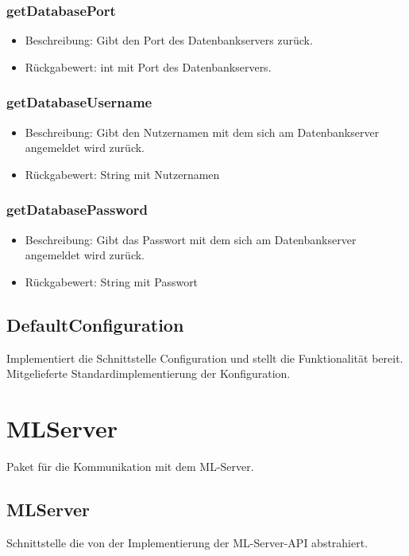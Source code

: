 \documentclass[a4paper]{scrreprt}
\begin{document}
    \subsubsection{getDatabasePort}
    \begin{itemize}
        \item Beschreibung: Gibt den Port des Datenbankservers zurück.
        \item Rückgabewert: int mit Port des Datenbankservers.
    \end{itemize}

    \subsubsection{getDatabaseUsername}
    \begin{itemize}
        \item Beschreibung: Gibt den Nutzernamen mit dem sich am Datenbankserver angemeldet wird zurück.
        \item Rückgabewert: String mit Nutzernamen
    \end{itemize}

    \subsubsection{getDatabasePassword}
    \begin{itemize}
        \item Beschreibung: Gibt das Passwort mit dem sich am Datenbankserver angemeldet wird zurück.
        \item Rückgabewert: String mit Passwort
    \end{itemize}

    \subsection{DefaultConfiguration}
    Implementiert die Schnittstelle Configuration und stellt die Funktionalität bereit.
    Mitgelieferte Standardimplementierung der Konfiguration.

    \section{MLServer}
    Paket für die Kommunikation mit dem ML-Server.

    \subsection{MLServer}
    Schnittstelle die von der Implementierung der ML-Server-API abstrahiert.
\end{document}
